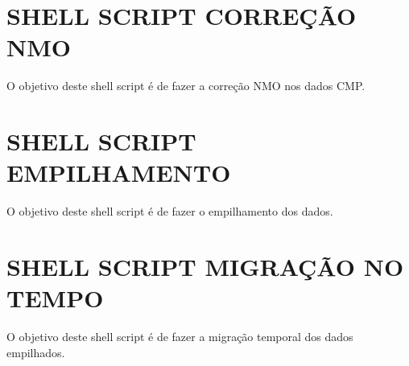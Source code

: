 

\chapter{SHELL SCRIPT CORREÇÃO NMO}
\label{apendice_F}

O objetivo deste shell script é de fazer a correção NMO nos dados CMP. 



\chapter{SHELL SCRIPT EMPILHAMENTO}
\label{apendice_G}

O objetivo deste shell script é de fazer o empilhamento dos dados. 



\chapter{SHELL SCRIPT MIGRAÇÃO NO TEMPO}
\label{apendice_H}

O objetivo deste shell script é de fazer a migração temporal dos dados empilhados. 








